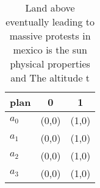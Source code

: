 \documentclass[a4paper]{article}
\begin{document}
\begin{table}
\begin{adjustbox}{width=0.9\columnwidth}
\begin{tabular}{|l|l|l|}
\hline
\textbf{plan} & \multicolumn{1}{c|}{\textbf{0}} & \multicolumn{1}{c|}{\textbf{1}} \\ \hline
\textbf{$a_0$}  & (0,0) & (1,0) \\ \hline
\textbf{$a_1$}  & (0,0) & (1,0) \\ \hline
\textbf{$a_2$}  & (0,0) & (1,0) \\ \hline
\textbf{$a_3$}  & (0,0) & (1,0) \\ \hline
\end{tabular}
\end{adjustbox}
\caption{Land above eventually leading to massive protests in mexico is the sun physical properties and The altitude t
}
\end{table}
\end{document}
